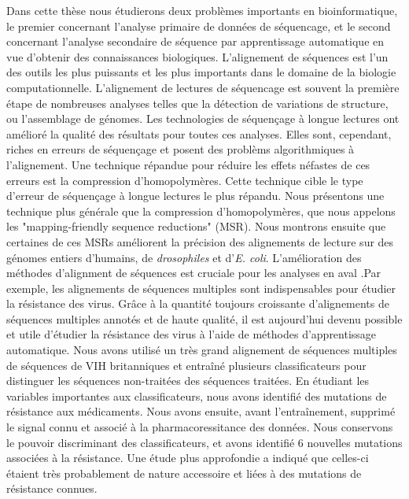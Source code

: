 Dans cette thèse nous étudierons deux problèmes importants en bioinformatique, le premier concernant l'analyse primaire de données de séquencage, et le second concernant l'analyse secondaire de séquence par apprentissage automatique en vue d'obtenir des connaissances biologiques. 
L'alignement de séquences est l'un des outils les plus puissants et les plus importants dans le domaine de la biologie computationnelle. L'alignement de lectures de séquencage est souvent la première étape de nombreuses analyses telles que la détection de variations de structure, ou l'assemblage de génomes. Les technologies de séquençage à longue lectures ont amélioré la qualité des résultats pour toutes ces analyses. Elles sont, cependant, riches en erreurs de séquençage et posent des problèms algorithmiques à l'alignement. Une technique répandue pour réduire les effets néfastes de ces erreurs est la compression d'homopolymères. Cette technique cible le type d'erreur de séquençage à longue lectures le plus répandu. 
Nous présentons une technique plus générale que la compression d'homopolymères, que nous appelons les "mapping-friendly sequence reductions" (MSR). Nous montrons ensuite que certaines de ces MSRs améliorent la précision des alignements de lecture sur des génomes entiers d'humains, de \textit{drosophiles} et d'\textit{E. coli}. 
L'amélioration des méthodes d'alignment de séquences est cruciale pour les analyses en aval .Par exemple, les alignements de séquences multiples sont indispensables pour étudier la résistance des virus. Grâce à la quantité toujours croissante d'alignements de séquences multiples annotés et de haute qualité, il est aujourd'hui devenu possible et utile d'étudier la résistance des virus à l'aide de méthodes d'apprentissage automatique.
Nous avons utilisé un très grand alignement de séquences multiples de séquences de VIH britanniques et entraîné plusieurs classificateurs pour distinguer les séquences non-traitées des séquences traitées. En étudiant les variables importantes aux classificateurs, nous avons identifié des mutations de résistance aux médicaments. Nous avons ensuite, avant l'entraînement, supprimé le signal connu et associé à la pharmacoressitance des données. Nous conservons le pouvoir discriminant des classificateurs, et avons identifié 6 nouvelles mutations associées à la résistance. Une étude plus approfondie a indiqué que celles-ci étaient très probablement de nature accessoire et liées à des mutations de résistance connues.
